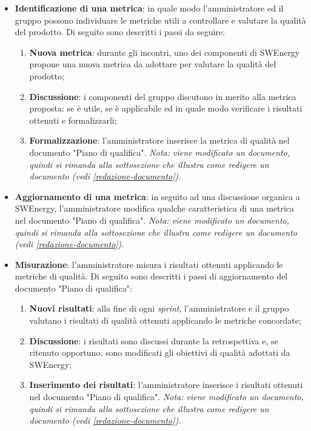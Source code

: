 \begin{itemize}
	\item \textbf{Identificazione di una metrica}: in quale modo
	      l'amministratore ed il gruppo possono individuare le metriche utili a
	      controllare e valutare la qualità del prodotto. Di seguito sono
	      descritti i passi da seguire:
	      \begin{enumerate}
		      \item \textbf{Nuova metrica}: durante gli incontri, uno dei
		            componenti di SWEnergy propone una nuova metrica da adottare
		            per valutare la qualità del prodotto;
		      \item \textbf{Discussione}: i componenti del gruppo discutono in
		            merito alla metrica proposta: se è utile, se è applicabile
		            ed in quale modo verificare i risultati ottenuti e
		            formalizzarli;
		      \item \textbf{Formalizzazione}: l'amministratore inserisce la
		            metrica di qualità nel documento "Piano di qualifica".
		            \textit{Nota: viene modificato un documento, quindi si rimanda alla
			            sottosezione che illustra come redigere un documento
			            (vedi \cref{redazione-documento})}.
	      \end{enumerate}
	\item \textbf{Aggiornamento di una metrica}: in seguito ad una discussione
	      organica a SWEnergy, l'amministratore modifica qualche caratteristica
	      di una metrica nel documento "Piano di qualifica". \textit{Nota:
		      viene modificato un documento, quindi si rimanda alla
		      sottosezione che illustra come redigere un documento
		      (vedi \cref{redazione-documento})}.
	\item \textbf{Misurazione}: l'amministratore misura i risultati ottenuti
	      applicando le metriche di qualità. Di seguito sono descritti i passi
	      di aggiornamento del documento "Piano di qualifica":
	      \begin{enumerate}
		      \item \textbf{Nuovi risultati}: alla fine di ogni \textit{sprint},
		            l'amministratore e il gruppo valutano i risultati di qualità
		            ottenuti applicando le metriche concordate;
		      \item \textbf{Discussione}: i risultati sono discussi durante la
		            retrospettiva e, se ritenuto opportuno, sono modificati
		            gli obiettivi di qualità adottati da SWEnergy;
		      \item \textbf{Inserimento dei risultati}: l'amministratore
		            inserisce i risultati ottenuti nel documento "Piano di
		            qualifica".
		            \textit{Nota: viene modificato un documento, quindi si rimanda
			            alla sottosezione che illustra come redigere un documento
			            (vedi \cref{redazione-documento}).}
	      \end{enumerate}
\end{itemize}

